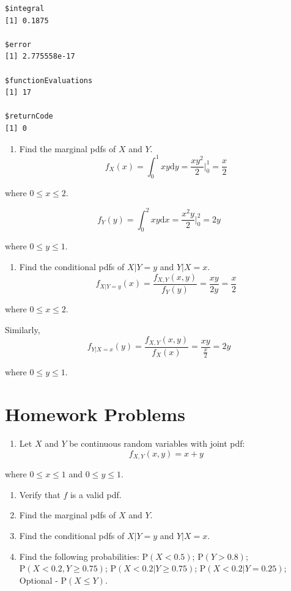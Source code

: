 \documentclass[
  letterpaper,
  DIV=11,
  numbers=noendperiod]{scrreprt}
\providecommand{\tightlist}{%
  \setlength{\itemsep}{0pt}\setlength{\parskip}{0pt}}\usepackage{longtable,booktabs,array}
\begin{document}
\begin{verbatim}
$integral
[1] 0.1875

$error
[1] 2.775558e-17

$functionEvaluations
[1] 17

$returnCode
[1] 0
\end{verbatim}

\begin{enumerate}
\def\labelenumi{\alph{enumi})}
\setcounter{enumi}{2}
\tightlist
\item
  Find the marginal pdfs of \(X\) and \(Y\). \[
  f_X(x)=\int_0^1 xy \mbox{d}y = \frac{xy^2}{2}\bigg|_0^1=\frac{x}{2}
  \]
\end{enumerate}

where \(0 \leq x \leq 2\).

\[
f_Y(y)=\int_0^2 xy \mbox{d}x = \frac{x^2y}{2}\bigg|_0^2= 2y
\]

where \(0 \leq y \leq 1\).

\begin{enumerate}
\def\labelenumi{\alph{enumi})}
\setcounter{enumi}{3}
\tightlist
\item
  Find the conditional pdfs of \(X|Y=y\) and \(Y|X=x\). \[
  f_{X|Y=y}(x)=\frac{f_{X,Y}(x,y)}{f_Y(y)}=\frac{xy}{2y}=\frac{x}{2}
  \]
\end{enumerate}

where \(0 \leq x \leq 2\).

Similarly, \[
f_{Y|X=x}(y)=\frac{f_{X,Y}(x,y)}{f_X(x)}=\frac{xy}{\frac{x}{2}}=2y\]

where \(0 \leq y \leq 1\).

\section{Homework Problems}\label{homework-problems-13}

\begin{enumerate}
\def\labelenumi{\arabic{enumi}.}
\tightlist
\item
  Let \(X\) and \(Y\) be continuous random variables with joint pdf: \[
  f_{X,Y}(x,y)=x + y
  \]
\end{enumerate}

where \(0 \leq x \leq 1\) and \(0 \leq y \leq 1\).

\begin{enumerate}
\def\labelenumi{\alph{enumi}.}
\tightlist
\item
  Verify that \(f\) is a valid pdf.\\
\item
  Find the marginal pdfs of \(X\) and \(Y\).\\
\item
  Find the conditional pdfs of \(X|Y=y\) and \(Y|X=x\).\\
\item
  Find the following probabilities: \(\mbox{P}(X<0.5)\);
  \(\mbox{P}(Y>0.8)\); \(\mbox{P}(X<0.2,Y\geq 0.75)\);
  \(\mbox{P}(X<0.2|Y\geq 0.75)\); \(\mbox{P}(X<0.2|Y= 0.25)\); Optional
  - \(\mbox{P}(X\leq Y)\).
\end{enumerate}
\end{document}
